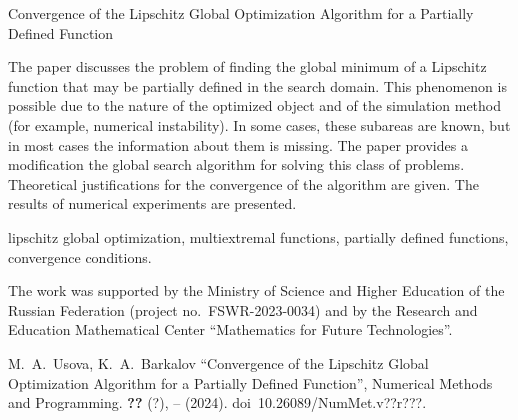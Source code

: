 \documentclass[10pt,a4paper]{book}
\begin{document}
    {Convergence of the Lipschitz Global Optimization Algorithm\break
    for a Partially Defined Function}
    
    {The paper discusses the problem of finding the global minimum of a Lipschitz function that may be partially defined in the search domain. This phenomenon is possible due to the nature of the optimized object and of the simulation method (for example, numerical instability). In some cases, these subareas are known, but in most cases the information about them is missing. The paper provides a modification the global search algorithm for solving this class of problems. Theoretical justifications for the convergence of the algorithm are given. The results of numerical experiments are presented.}

        {lipschitz global optimization, 
        multiextremal functions, 
        partially defined functions,
        convergence conditions.}

    {The work was supported by the Ministry of Science and Higher Education of the Russian Federation (project no.~FSWR-2023-0034) and by the Research and Education Mathematical Center ``Mathematics for Future Technologies''.}

    {M.~A.~Usova, K.~A.~Barkalov
    ``Convergence of the Lipschitz Global Optimization Algorithm
    for a Partially Defined Function'',
    Numerical Methods and Programming. \textbf{??} (?), 
    \pageref*{firstPage}--\pageref*{LastPage} (2024).
    doi~10.26089/NumMet.v??r???.}
\end{document}
